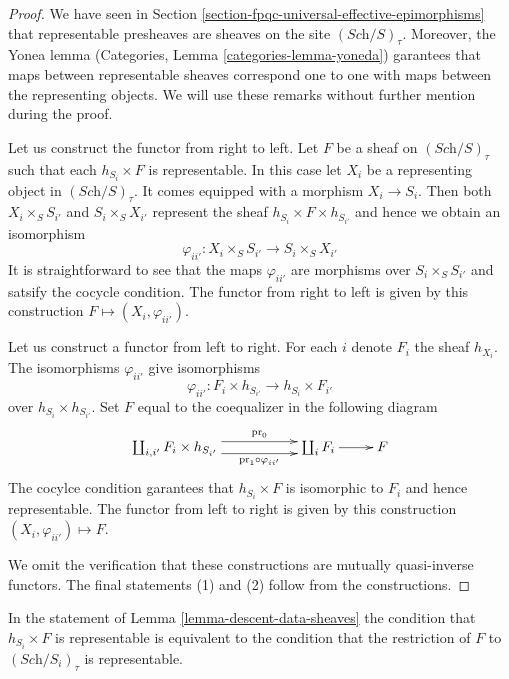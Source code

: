 \begin{proof}
We have seen in Section \ref{section-fpqc-universal-effective-epimorphisms}
that representable presheaves are sheaves on the site $(\textit{Sch}/S)_\tau$.
Moreover, the Yonea lemma (Categories, Lemma \ref{categories-lemma-yoneda})
garantees that maps between representable
sheaves correspond one to one with maps between the representing objects.
We will use these remarks without further mention during the proof.

\medskip\noindent
Let us construct the functor from right to left.
Let $F$ be a sheaf on $(\textit{Sch}/S)_\tau$ such that each
$h_{S_i} \times F$ is representable. In this case let $X_i$
be a representing object in $(\textit{Sch}/S)_\tau$.
It comes equipped with a morphism $X_i \to S_i$.
Then both $X_i \times_S S_{i'}$ and $S_i \times_S X_{i'}$
represent the sheaf $h_{S_i} \times F \times h_{S_{i'}}$
and hence we obtain an isomorphism
$$
\varphi_{ii'} : X_i \times_S S_{i'} \to S_i \times_S X_{i'}
$$
It is straightforward to see that the maps $\varphi_{ii'}$
are morphisms over $S_i \times_S S_{i'}$ and satsify the
cocycle condition. The functor from right to left is given
by this construction $F \mapsto (X_i, \varphi_{ii'})$.

\medskip\noindent
Let us construct a functor from left to right.
For each $i$ denote $F_i$ the sheaf $h_{X_i}$.
The isomorphisms $\varphi_{ii'}$ give isomorphisms
$$
\varphi_{ii'} :
F_i \times h_{S_{i'}}
\longrightarrow
h_{S_i} \times F_{i'}
$$
over $h_{S_i} \times h_{S_{i'}}$.
Set $F$ equal to the coequalizer in the following diagram
$$
\xymatrix{
\coprod_{i, i'} F_i \times h_{S_{i'}}
\ar@<1ex>[rr]^-{\text{pr}_0}
\ar@<-1ex>[rr]_-{\text{pr}_1 \circ \varphi_{ii'}}
& &
\coprod_i F_i \ar[r]
&
F
}
$$
The cocylce condition garantees that $h_{S_i} \times F$ is
isomorphic to $F_i$ and hence representable.
The functor from left to right is given
by this construction $(X_i, \varphi_{ii'}) \mapsto F$.

\medskip\noindent
We omit the verification that these constructions
are mutually quasi-inverse functors. The final statements
(1) and (2) follow from the constructions.
\end{proof}

\begin{remark}
\label{remark-what-product-means}
In the statement of Lemma \ref{lemma-descent-data-sheaves} the condition that
$h_{S_i} \times F$ is representable is equivalent to
the condition that the restriction of $F$ to
$(\textit{Sch}/S_i)_\tau$ is representable.
\end{remark}
















